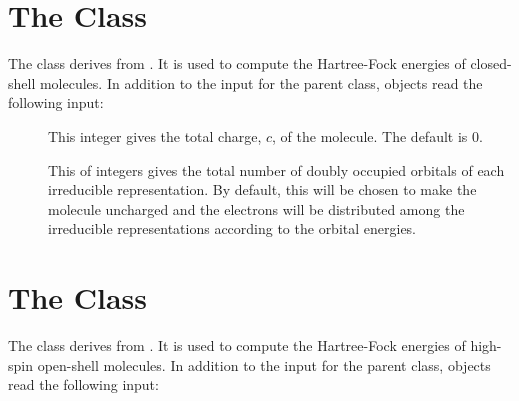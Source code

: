 
\section{The  Class}
\label{CLSCF}

The  class derives from .  It is used to compute
the Hartree-Fock energies of closed-shell molecules.  In addition to the
input for the  parent class,  objects read the
following input:

\begin{description}
  \item[] This integer gives the total charge, $c$, of
     the molecule.  The default is 0.

  \item[] This  of integers gives the
     total number of doubly occupied orbitals of each irreducible
     representation.  By default, this will be chosen to make the molecule
     uncharged and the electrons will be distributed among the irreducible
     representations according to the orbital energies.

\end{description}


\section{The  Class}
\label{HSOSSCF}

The  class derives from .  It is used to
compute the Hartree-Fock energies of high-spin open-shell molecules.  In
addition to the input for the  parent class, 
objects read the following input:

